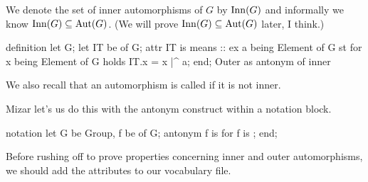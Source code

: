\begin{def-remark}
We denote the set of inner automorphisms of $G$ by $\operatorname{Inn}(G)$ and
informally we know $\operatorname{Inn}(G)\subseteq\operatorname{Aut}(G)$. (We will prove
$\operatorname{Inn}(G)\subseteq\operatorname{Aut}(G)$ later, I think.)
\end{def-remark}

\nwenddocs{}\endmoddef\nwstartdeflinemarkup{}\nwenddeflinemarkup
definition
  let G;
  let IT be  of G;
  attr IT is  means
  ::
  ex a being Element of G st
  for x being Element of G holds IT.x = x |^ a;
end;
\LA{}Outer as antonym of inner~{\nwtagstyle{}}\RA{}
\eatline
{}\nwendcode{}\nwdocspar
\begin{notation}
We also recall that an automorphism is called  if it is
not inner.
\end{notation}

Mizar let's us do this with the {\Tt{}antonym\nwendquote} construct within a
{\Tt{}notation\nwendquote} block.

\nwenddocs{}\endmoddef\nwstartdeflinemarkup{}\nwenddeflinemarkup
notation
  let G be Group, f be  of G;
  antonym f is  for f is ;
end;
\eatline
{}\nwendcode{}\nwdocspar
\begin{voc}
Before rushing off to prove properties concerning inner and outer
automorphisms, we should add the attributes to our vocabulary file.
\end{voc}

